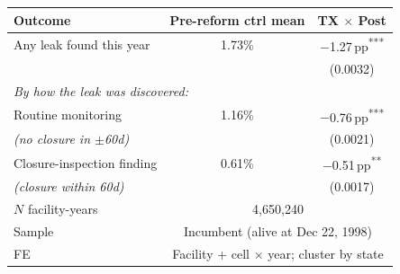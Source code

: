 \begin{tabular}{lcc}
\toprule
Outcome & Pre-reform ctrl mean & TX $\times$ Post \\
\midrule
Any leak found this year                       & 1.73\% & $-$1.27\,pp\textsuperscript{***} \\
                                               &        & (0.0032)                         \\
\midrule
\multicolumn{3}{l}{\textit{By how the leak was discovered:}}                                \\
\hspace{0.5em}Routine monitoring               & 1.16\% & $-$0.76\,pp\textsuperscript{***} \\
\hspace{0.5em}\textit{(no closure in $\pm$60d)}&        & (0.0021)                         \\
\hspace{0.5em}Closure-inspection finding       & 0.61\% & $-$0.51\,pp\textsuperscript{**}  \\
\hspace{0.5em}\textit{(closure within 60d)}    &        & (0.0017)                         \\
\midrule
$N$ facility-years & \multicolumn{2}{c}{4{,}650{,}240}                                                  \\
Sample             & \multicolumn{2}{c}{Incumbent (alive at Dec 22, 1998)}                             \\
FE                 & \multicolumn{2}{c}{Facility + cell $\times$ year; cluster by state}    \\
\bottomrule
\end{tabular}
